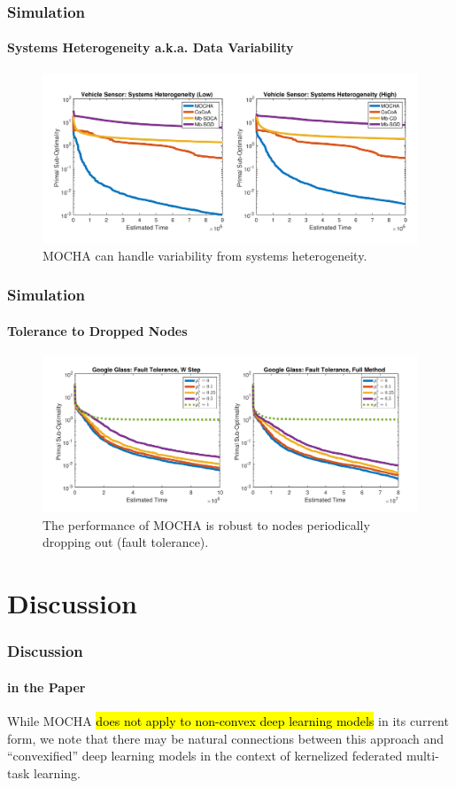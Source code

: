\documentclass[UTF8,aspectratio=169,presentation]{ctexbeamer}
\makeatletter
\let\HL\hl
\renewcommand\hl{%
  \let\set@color\beamerorig@set@color
  \let\reset@color\beamerorig@reset@color
  \HL}
\makeatother
\begin{document}
\begin{frame}[t]
  \frametitle{Simulation}
  \framesubtitle{Systems Heterogeneity a.k.a. Data Variability}
  \begin{figure}[htpb]
    \centering
    \includegraphics[width=0.8\linewidth]{images/system.png}
    \caption{MOCHA can handle variability from systems heterogeneity.}%
    \label{fig:name}
  \end{figure} 
\end{frame}


\begin{frame}[t]
  \frametitle{Simulation}
  \framesubtitle{Tolerance to Dropped Nodes}
  \begin{figure}[htpb]
    \centering
    \includegraphics[width=0.8\linewidth]{images/2021-05-27_13-15.png}
    \caption{The performance of MOCHA is robust to nodes periodically dropping out (fault tolerance).}%
    \label{fig:4}
  \end{figure} 
\end{frame}

\section{Discussion}

\begin{frame}[t]
  \frametitle{Discussion}
  \framesubtitle{in the Paper}

  While MOCHA \hl{does not apply to non-convex deep learning models} in its current form, we note that there may be natural
connections between this approach and “convexified” deep learning models in the
context of kernelized federated multi-task learning.
  
\end{frame}
\end{document}
